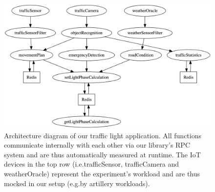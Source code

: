 \documentclass[../main.tex]{subfiles}
\begin{document}
\begin{figure}
\begin{center}
  \includegraphics[width=\linewidth,keepaspectratio]{./iot-architecture-diagram.png}
\end{center}
\caption[IoT Architecture Diagram]{%
  Architecture diagram of our traffic light application.
  All functions communicate internally with each other via our library's RPC system
  and are thus automatically measured at runtime.
  The IoT devices in the top row (i.e.\@ trafficSensor, trafficCamera and weatherOracle) 
  represent the experiment's workload and are thus mocked in our setup (e.g.\@ by artillery workloads).%
}%
\label{fig:iotArchitectureDiagram}
\end{figure}
\end{document}
